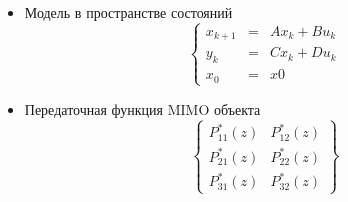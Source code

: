 \documentclass[12pt]{article}
\begin{document}
\begin{itemize}


\item Модель в пространстве состояний
$$ \left\{\begin{array}{rcl}
  x_{k+1} & = & Ax_k+Bu_k \\
  y_k & = & Cx_k+Du_k \\
  x_0 & = & x0
\end{array}\right. $$

\item Передаточная функция MIMO объекта
$$ \left\{\begin{array}{ll}
  P_{11}^*(z) & P_{12}^*(z) \\
  P_{21}^*(z) & P_{22}^*(z) \\
  P_{31}^*(z) & P_{32}^*(z)
\end{array}\right\} $$

\end{itemize}
\end{document}
